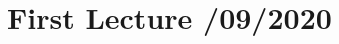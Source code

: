 \documentclass[../../main/main.tex]{subfiles}
\begin{document}
\section{First Lecture /09/2020}
\label{sec:lec1}
\end{document}
